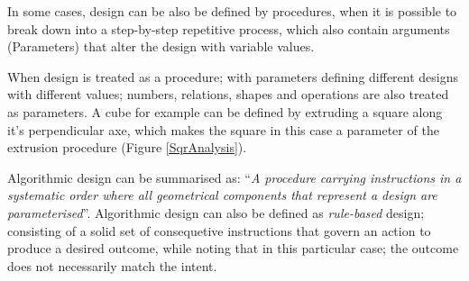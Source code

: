 In some cases, design can be also be defined by procedures, when it is possible to break down into a
step-by-step repetitive process, which also contain arguments (Parameters) that alter the design
with variable values.

When design is treated as a procedure; with parameters defining different designs with different
values; numbers, relations, shapes and operations are also treated as parameters. A cube for example
can be defined by extruding a square along it's perpendicular axe, which makes the square in this
case a parameter of the extrusion procedure (Figure \ref{SqrAnalysis}).

Algorithmic design can be summarised as: ``\emph{A procedure carrying instructions in a systematic
order where all geometrical components that represent a design are
parameterised}''\cite{hernandez06}. Algorithmic design can also be defined as \emph{rule-based}
design; consisting of a solid set of consequetive instructions that govern an action
to produce a desired outcome, while noting that in this particular case; the outcome does not
necessarily match the intent.
